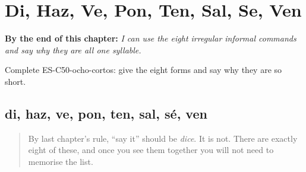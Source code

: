 
\chapter{Di, Haz, Ve, Pon, Ten, Sal, Se, Ven}
\label{ch:command-irregular}

\begin{chapteropening}
\textbf{By the end of this chapter:} \emph{I can use the eight irregular informal commands and say why they are all one syllable.}

Complete ES-C50-ocho-cortos: give the eight forms and say why they are so short.
\end{chapteropening}

\section[di · haz · ve · pon · ten · sal · sé · ven]{di, haz, ve, pon, ten, sal, sé, ven}

\label{lesson:ES-C50-ocho-cortos}



\begin{quote}
By last chapter's rule, \textquotedblleft{}say it\textquotedblright{} should be \emph{dice}. It is not. There are exactly eight of these, and once you see them together you will not need to memorise the list.
\end{quote}

